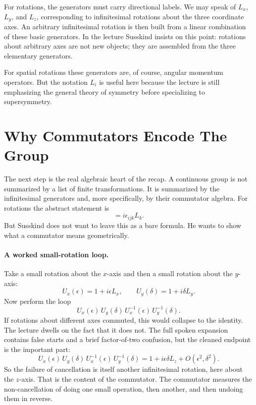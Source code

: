 For rotations, the generators must carry directional labels. We may speak of \(L_x\), \(L_y\), and \(L_z\), corresponding to infinitesimal rotations about the three coordinate axes. An arbitrary infinitesimal rotation is then built from a linear combination of these basic generators. In the lecture Susskind insists on this point: rotations about arbitrary axes are not new objects; they are assembled from the three elementary generators.

For spatial rotations these generators are, of course, angular momentum operators. But the notation \(L_i\) is useful here because the lecture is still emphasizing the general theory of symmetry before specializing to supersymmetry.

\section{Why Commutators Encode The Group}

The next step is the real algebraic heart of the recap. A continuous group is not summarized by a list of finite transformations. It is summarized by the infinitesimal generators and, more specifically, by their commutator algebra. For rotations the abstract statement is
\begin{equation}
[L_i,L_j]=i\epsilon_{ijk}L_k.
\end{equation}
But Susskind does not want to leave this as a bare formula. He wants to show what a commutator means geometrically.

\paragraph{A worked small-rotation loop.}

Take a small rotation about the \(x\)-axis and then a small rotation about the \(y\)-axis:
\begin{equation}
U_x(\epsilon)=1+i\epsilon L_x,
\qquad
U_y(\delta)=1+i\delta L_y.
\end{equation}
Now perform the loop
\begin{equation}
U_x(\epsilon)\,U_y(\delta)\,U_x^{-1}(\epsilon)\,U_y^{-1}(\delta).
\end{equation}
If rotations about different axes commuted, this would collapse to the identity. The lecture dwells on the fact that it does not. The full spoken expansion contains false starts and a brief factor-of-two confusion, but the cleaned endpoint is the important part:
\begin{equation}
U_x(\epsilon)\,U_y(\delta)\,U_x^{-1}(\epsilon)\,U_y^{-1}(\delta)
=
1+i\epsilon\delta L_z+O(\epsilon^2,\delta^2).
\end{equation}
So the failure of cancellation is itself another infinitesimal rotation, here about the \(z\)-axis. That is the content of the commutator. The commutator measures the non-cancellation of doing one small operation, then another, and then undoing them in reverse.

